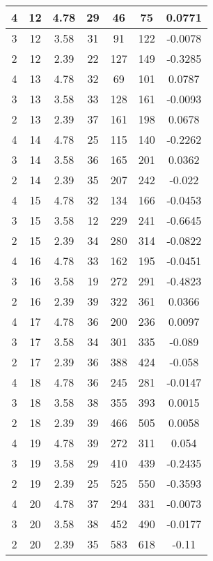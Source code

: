 \documentclass[letterpaper, 12pt]{article}
\begin{document}
\begin{longtable}{|c|c|c|c|c|c|c|}
\hline
4 & 12 & 4.78 & 29 & 46 & 75 & 0.0771 \\
\hline
3 & 12 & 3.58 & 31 & 91 & 122 & -0.0078 \\
\hline
2 & 12 & 2.39 & 22 & 127 & 149 & -0.3285 \\
\hline
4 & 13 & 4.78 & 32 & 69 & 101 & 0.0787 \\
\hline
3 & 13 & 3.58 & 33 & 128 & 161 & -0.0093 \\
\hline
2 & 13 & 2.39 & 37 & 161 & 198 & 0.0678 \\
\hline
4 & 14 & 4.78 & 25 & 115 & 140 & -0.2262 \\
\hline
3 & 14 & 3.58 & 36 & 165 & 201 & 0.0362 \\
\hline
2 & 14 & 2.39 & 35 & 207 & 242 & -0.022 \\
\hline
4 & 15 & 4.78 & 32 & 134 & 166 & -0.0453 \\
\hline
3 & 15 & 3.58 & 12 & 229 & 241 & -0.6645 \\
\hline
2 & 15 & 2.39 & 34 & 280 & 314 & -0.0822 \\
\hline
4 & 16 & 4.78 & 33 & 162 & 195 & -0.0451 \\
\hline
3 & 16 & 3.58 & 19 & 272 & 291 & -0.4823 \\
\hline
2 & 16 & 2.39 & 39 & 322 & 361 & 0.0366 \\
\hline
4 & 17 & 4.78 & 36 & 200 & 236 & 0.0097 \\
\hline
3 & 17 & 3.58 & 34 & 301 & 335 & -0.089 \\
\hline
2 & 17 & 2.39 & 36 & 388 & 424 & -0.058 \\
\hline
4 & 18 & 4.78 & 36 & 245 & 281 & -0.0147 \\
\hline
3 & 18 & 3.58 & 38 & 355 & 393 & 0.0015 \\
\hline
2 & 18 & 2.39 & 39 & 466 & 505 & 0.0058 \\
\hline
4 & 19 & 4.78 & 39 & 272 & 311 & 0.054 \\
\hline
3 & 19 & 3.58 & 29 & 410 & 439 & -0.2435 \\
\hline
2 & 19 & 2.39 & 25 & 525 & 550 & -0.3593 \\
\hline
4 & 20 & 4.78 & 37 & 294 & 331 & -0.0073 \\
\hline
3 & 20 & 3.58 & 38 & 452 & 490 & -0.0177 \\
\hline
2 & 20 & 2.39 & 35 & 583 & 618 & -0.11 \\
\hline
\end{longtable}
\end{document}
